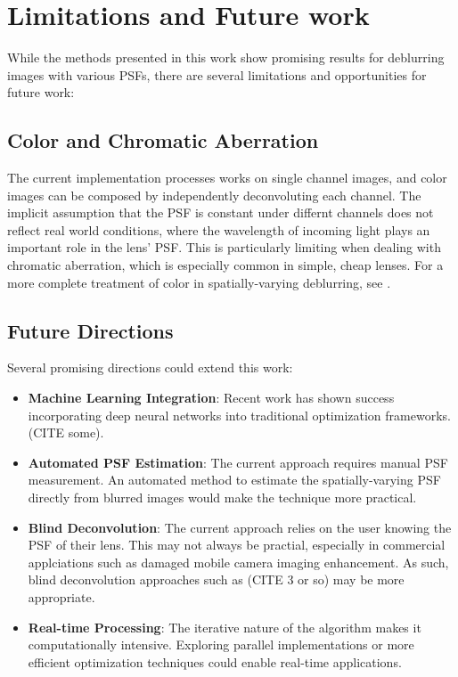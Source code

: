 \documentclass[sigconf]{acmart}
\begin{document}
\section{Limitations and Future work}
While the methods presented in this work show promising results for deblurring images with various PSFs, there are several limitations and opportunities for future work:

\subsection{Color and Chromatic Aberration}\label{sec:limitations}
The current implementation processes works on single channel images, and color images can be composed by independently deconvoluting each channel. The implicit assumption that the PSF is constant under differnt channels does not reflect real world conditions, where the wavelength of incoming light plays an important role in the lens' PSF. This is particularly limiting when dealing with chromatic aberration, which is especially common in simple, cheap lenses. For a more complete treatment of color in spatially-varying deblurring, see \cite{simplelens}.

\subsection{Future Directions}
Several promising directions could extend this work:

\begin{itemize}
    \item \textbf{Machine Learning Integration}: Recent work has shown success incorporating deep neural networks into traditional optimization frameworks. (CITE some).
    
    \item \textbf{Automated PSF Estimation}: The current approach requires manual PSF measurement. An automated method to estimate the spatially-varying PSF directly from blurred images would make the technique more practical.
    
    \item \textbf{Blind Deconvolution}: The current approach relies on the user knowing the PSF of their lens. This may not always be practial, especially in commercial applciations such as damaged mobile camera imaging enhancement. As such, blind deconvolution approaches such as (CITE 3 or so) may be more appropriate.
    
    \item \textbf{Real-time Processing}: The iterative nature of the algorithm makes it computationally intensive. Exploring parallel implementations or more efficient optimization techniques could enable real-time applications.
\end{itemize}
\end{document}
